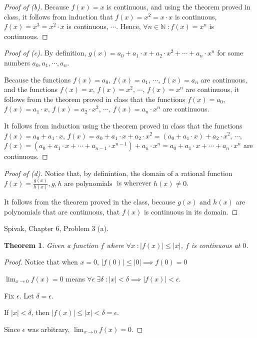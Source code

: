 \documentclass{article} %
\theoremstyle{plain}
\newtheorem*{theorem*}{Theorem}
\theoremstyle{definition}
\begin{document}
\begin{proof}[Proof of (b)] 
    Because $f(x) = x$ is continuous, and using the theorem proved in class, it follows from induction that $f(x) = x^2 = x \cdot x$ is continuous, $f(x) = x^3 = x^2 \cdot x$ is continuous, $\cdots$.  Hence, $\forall n \in \mathbb{N} \; \colon f(x) = x^n$ is continuous. 
\end{proof} 

\begin{proof}[Proof of (c)] 
    By definition, $g(x) = a_0 + a_1 \cdot x + a_2 \cdot x^2 + \cdots + a_n \cdot x^n$ for some numbers $a_0, a_1, \cdots, a_n$.

    Because the functions $f(x) = a_0$, $f(x) = a_1$, $\cdots$, $f(x) = a_n$ are continuous, and the functions $f(x) = x$, $f(x) = x^2$, $\cdots$, $f(x) = x^n$ are continuous, it follows from the theorem proved in class that the functions $f(x) = a_0$, $f(x) = a_1 \cdot x$, $f(x) = a_2 \cdot x^2$, $\cdots$, $f(x) = a_n \cdot x^n$ are continuous.

    It follows from induction using the theorem proved in class that the functions $f(x) = a_0 + a_1 \cdot x$, $f(x) = a_0 + a_1 \cdot x + a_2 \cdot x^2 = (a_0 + a_1 \cdot x) + a_2 \cdot x^2$, $\cdots$, $f(x) = (a_0 + a_1 \cdot x + \cdots + a_{n-1} \cdot x^{n-1}) + a_n \cdot x^n = a_0 + a_1 \cdot x + \cdots + a_n \cdot x^n$ are continuous.
\end{proof} 

\begin{proof}[Proof of (d)] 
    Notice that, by definintion, the domain of a rational function $f(x) = \frac{g(x)}{h(x)}, g,h \text { are polynomials }$ is wherever $h(x) \neq 0$.

    It follows from the theorem proved in the class, because $g(x)$ and $h(x)$ are polynomials that are continuous, that $f(x)$ is continuous in its domain.
\end{proof} 

\noindent{} Spivak, Chapter 6, Problem 3 (a). 

\begin{theorem*} Given a function $f$ where $\forall x \; \colon |f(x)| \leq |x|$, $f$ is continuous at $0$.
\end{theorem*}

\begin{proof} 
    Notice that when $x=0$, $|f(0)| \leq |0| \implies f(0) = 0$
    
    $\lim_{x \to 0} f(x) = 0$ means $\forall \epsilon \; \exists \delta \; \colon |x| < \delta \implies |f(x)| < \epsilon$.

    Fix $\epsilon$. Let $\delta = \epsilon$.

    If $|x| < \delta$, then $|f(x)| \leq |x| < \delta = \epsilon$.

    Since $\epsilon$ was arbitrary,  $\lim_{x \to 0} f(x) = 0$.
\end{proof} 

    
    
\end{document}
